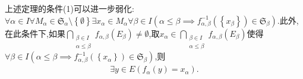 \begin{remark}{}{}
	上述定理的条件(1)可以进一步弱化:$\forall\alpha\in I\forall M_{\alpha}\in\mathfrak{S}_{\alpha}\setminus\left\{\emptyset\right\}\exists x_{\alpha}\in M_{\alpha}\forall\beta\in I\left(\alpha\leq\beta\implies f_{\alpha,\beta}^{-1}\left(\left\{x_{\beta}\right\}\right)\in\mathfrak{S}_{\beta}\right)$.此外,在此条件下,如果$\bigcap\limits_{\substack{\beta\in I\\ \alpha\leq\beta}}f_{\alpha,\beta}\left(E_{\beta}\right)\neq\emptyset$,取$x_{\alpha}\in\bigcap\limits_{\substack{\beta\in I\\ \alpha\leq\beta}}f_{\alpha,\beta}\left(E_{\beta}\right)$使得$\forall\beta\in I\left(\alpha\leq\beta\implies f_{\alpha,\beta}^{-1}\left(\left\{x_{\alpha}\right\}\right)\in\mathfrak{S}_{\beta}\right)$,则
	\begin{align*}
		\exists y\in E\left(f_{\alpha}\left(y\right)=x_{\alpha}\right).
	\end{align*}
\end{remark}





























